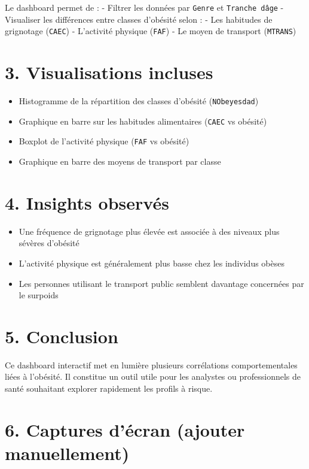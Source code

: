 \documentclass[
]{article}
\providecommand{\tightlist}{%
  \setlength{\itemsep}{0pt}\setlength{\parskip}{0pt}}
\begin{document}
Le dashboard permet de : - Filtrer les données par \texttt{Genre} et
\texttt{Tranche\ d\textquotesingle{}âge} - Visualiser les différences
entre classes d'obésité selon : - Les habitudes de grignotage
(\texttt{CAEC}) - L'activité physique (\texttt{FAF}) - Le moyen de
transport (\texttt{MTRANS})

\section{3. Visualisations incluses}\label{visualisations-incluses}

\begin{itemize}
\tightlist
\item
  Histogramme de la répartition des classes d'obésité
  (\texttt{NObeyesdad})
\item
  Graphique en barre sur les habitudes alimentaires (\texttt{CAEC} vs
  obésité)
\item
  Boxplot de l'activité physique (\texttt{FAF} vs obésité)
\item
  Graphique en barre des moyens de transport par classe
\end{itemize}

\section{4. Insights observés}\label{insights-observuxe9s}

\begin{itemize}
\tightlist
\item
  Une fréquence de grignotage plus élevée est associée à des niveaux
  plus sévères d'obésité
\item
  L'activité physique est généralement plus basse chez les individus
  obèses
\item
  Les personnes utilisant le transport public semblent davantage
  concernées par le surpoids
\end{itemize}

\section{5. Conclusion}\label{conclusion}

Ce dashboard interactif met en lumière plusieurs corrélations
comportementales liées à l'obésité. Il constitue un outil utile pour les
analystes ou professionnels de santé souhaitant explorer rapidement les
profils à risque.

\section{6. Captures d'écran (ajouter
manuellement)}\label{captures-duxe9cran-ajouter-manuellement}
\end{document}
